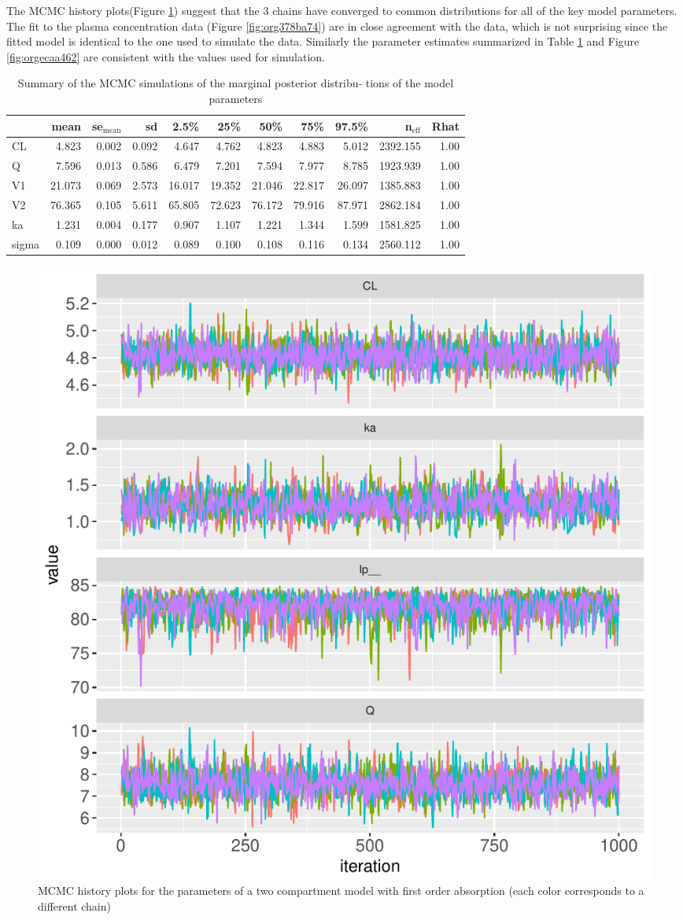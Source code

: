 \documentclass[11pt, reqno]{amsbook}
\numberwithin{section}{chapter}
\theoremstyle{remark}
\begin{document}
The MCMC history plots(Figure \ref{fig:org44eb541})
suggest that the 3 chains have converged to common distributions for
all of the key model parameters. The fit to the plasma concentration
data (Figure \ref{fig:org378ba74}) are in close agreement with the
data, which is not surprising since the fitted model is identical to
the one used to simulate the data. Similarly the parameter estimates
summarized in Table \ref{tab:orgc99abfe} and Figure \ref{fig:orgecaa462}
are consistent with the values used for simulation.

\begin{table}[htbp]
\caption{\label{tab:orgc99abfe}
Summary of the MCMC simulations of the marginal posterior distribu- tions of the model parameters}
\centering
\begin{tabular}{lrrrrrrrrrr}
\hline
 & mean & se\(_{\text{mean}}\) & sd & 2.5\% & 25\% & 50\% & 75\% & 97.5\% & n\(_{\text{eff}}\) & Rhat\\
\hline
CL & 4.823 & 0.002 & 0.092 & 4.647 & 4.762 & 4.823 & 4.883 & 5.012 & 2392.155 & 1.00\\
Q & 7.596 & 0.013 & 0.586 & 6.479 & 7.201 & 7.594 & 7.977 & 8.785 & 1923.939 & 1.00\\
V1 & 21.073 & 0.069 & 2.573 & 16.017 & 19.352 & 21.046 & 22.817 & 26.097 & 1385.883 & 1.00\\
V2 & 76.365 & 0.105 & 5.611 & 65.805 & 72.623 & 76.172 & 79.916 & 87.971 & 2862.184 & 1.00\\
ka & 1.231 & 0.004 & 0.177 & 0.907 & 1.107 & 1.221 & 1.344 & 1.599 & 1581.825 & 1.00\\
sigma & 0.109 & 0.000 & 0.012 & 0.089 & 0.100 & 0.108 & 0.116 & 0.134 & 2560.112 & 1.00\\
\hline
\end{tabular}
\end{table}


\begin{figure}[htbp]
\centering
\includegraphics[width=0.6\linewidth]{../example-models/R/deliv/figure/TwoCptModel/TwoCptModelPlots001.pdf}
\caption{\label{fig:org44eb541}
MCMC history plots for the parameters of a two compartment model with first order absorption (each color corresponds to a different chain)}
\end{figure}
\end{document}
